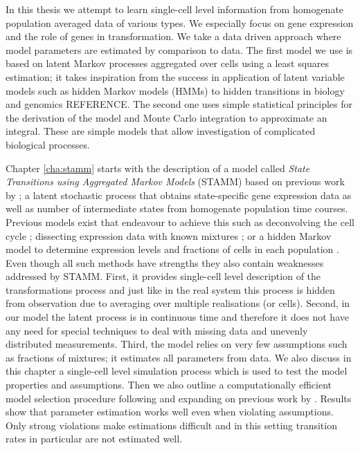 In this thesis we attempt to learn single-cell level information from homogenate population averaged data of various types. We especially focus on gene expression and the role of genes in transformation. We take a data driven approach where model parameters are estimated by comparison to data. The first model we use is based on latent Markov processes aggregated over cells using a least squares estimation; it takes inspiration from the success in application of latent variable models such as hidden Markov models (HMMs) to hidden transitions in biology and genomics {\color{red} REFERENCE}. The second one uses simple statistical principles for the derivation of the model and Monte Carlo integration to approximate an integral. These are simple models that allow investigation of complicated biological processes.

Chapter \ref{cha:stamm} starts with the description of a model called \emph{State Transitions using Aggregated Markov Models} (STAMM) based on previous work by \cite{Armond:2013}; a latent stochastic process that obtains state-specific gene expression data as well as number of intermediate states from homogenate population time courses. Previous models exist that endeavour to achieve this such as deconvolving the cell cycle \citep{Bar-Joseph04082004}; dissecting expression data with known mixtures \citep{Lahdesmaki:2005fh}; or a hidden Markov model to determine expression levels and fractions of cells in each population \citep{Roy:2006ik}. Even though all such methods have strengths they also contain weaknesses addressed by STAMM. First, it provides single-cell level description of the transformations process and just like in the real system this process is hidden from observation due to averaging over multiple realisations (or cells). Second, in our model the latent process is in continuous time and therefore it does not have any need for special techniques to deal with missing data and unevenly distributed measurements. Third, the model relies on very few assumptions such as fractions of mixtures; it estimates all parameters from data. We also discuss in this chapter a single-cell level simulation process which is used to test the model properties and assumptions. Then we also outline a computationally efficient model selection procedure following and expanding on previous work by \cite{Armond:2013}. Results show that parameter estimation works well even when violating assumptions. Only strong violations make estimations difficult and in this setting transition rates in particular are not estimated well.


